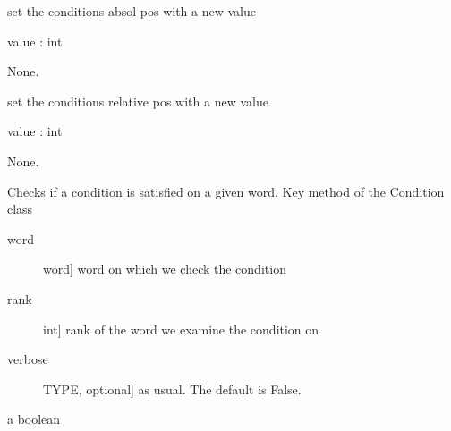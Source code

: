 \documentclass[letterpaper,10pt,english]{sphinxmanual}
\begin{document}
\begin{fulllineitems}
\begin{description}
\end{description}

\begin{fulllineitems}
\label{\detokenize{index:Condition.P_condition.set_absol_pos}}
\sphinxAtStartPar
set the condition\textquotesingle{}s absol pos with a new value\textquotesingle{}

\sphinxAtStartPar
value : int

\sphinxAtStartPar
None.

\end{fulllineitems}


\begin{fulllineitems}
\label{\detokenize{index:Condition.P_condition.set_rel_pos}}
\sphinxAtStartPar
set the condition\textquotesingle{}s relative pos with a new value\textquotesingle{}

\sphinxAtStartPar
value : int

\sphinxAtStartPar
None.

\end{fulllineitems}


\begin{fulllineitems}
\label{\detokenize{index:Condition.P_condition.test}}
\sphinxAtStartPar
Checks if a condition is satisfied on a given word.
Key method of the Condition class
\begin{description}
\item[{word}] \leavevmode{[}word{]}
\sphinxAtStartPar
word on which we check the condition

\item[{rank}] \leavevmode{[}int{]}
\sphinxAtStartPar
rank of the word we examine the condition on

\item[{verbose}] \leavevmode{[}TYPE, optional{]}
\sphinxAtStartPar
as usual. The default is False.

\end{description}

\sphinxAtStartPar
a boolean

\end{fulllineitems}


\end{fulllineitems}
\end{document}
